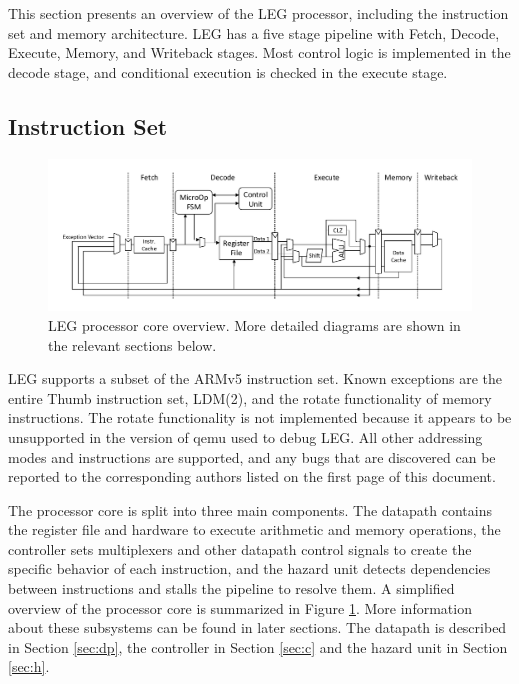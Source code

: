 This section presents an overview of the LEG processor, including the instruction set and memory architecture.
LEG has a five stage pipeline with Fetch, Decode, Execute, Memory, and Writeback stages.
Most control logic is implemented in the decode stage, and conditional execution is checked in the execute stage.

\subsection{Instruction Set}
\begin{figure}[h!]
\centering
\includegraphics[width=\textwidth]{./diagrams/datapath_simple.pdf}
\caption{LEG processor core overview. More detailed diagrams are shown in the relevant sections below.}
\label{fig:core}
\end{figure}


LEG supports a subset of the ARMv5 instruction set. 
Known exceptions are the entire Thumb instruction set, LDM(2), and the rotate functionality of memory instructions.
The rotate functionality is not implemented because it appears to be unsupported in the version of qemu used to debug LEG.
All other addressing modes and instructions are supported, and any bugs that are discovered can be reported to the corresponding authors listed on the first page of this document.

The processor core is split into three main components.
The datapath contains the register file and hardware to execute arithmetic and memory operations, the controller sets multiplexers and other datapath control signals to create the specific behavior of each instruction, and the hazard unit detects dependencies between instructions and stalls the pipeline to resolve them.
A simplified overview of the processor core is summarized in Figure \ref{fig:core}.
More information about these subsystems can be found in later sections.
The datapath is described in Section \ref{sec:dp}, the controller in Section \ref{sec:c} and the hazard unit in Section \ref{sec:h}.




